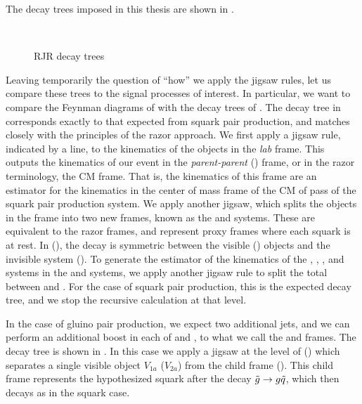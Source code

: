 The decay trees imposed in this thesis are shown in .
\begin{figure}[tbp]
\caption{RJR decay trees} \label{fig:decay_trees}
 \\
\end{figure}
Leaving temporarily the question of ``how'' we apply the jigsaw rules, let us compare these trees to the signal processes of interest.
In particular, we want to compare the Feynman diagrams of  with the decay trees of .
The decay tree in  corresponds exactly to that expected from squark pair production, and matches closely with the principles of the razor approach.
We first apply a jigsaw rule, indicated by a line, to the kinematics of the objects in the \textit{lab} frame.
This outputs the kinematics of our event in the \textit{parent-parent} (\PP) frame, or in the razor terminology, the CM frame.
That is, the kinematics of this frame are an estimator for the kinematics in the center of mass frame of the CM of pass of the squark pair production system.
We apply another jigsaw, which splits the objects in the \PP frame into two new frames, known as the \Pa and \Pb systems.
These are equivalent to the razor frames, and represent proxy frames where each squark is at rest.
In \Pa (\Pb), the decay is symmetric between the visible \Va (\Vb) objects and the invisible system \Ia (\Ib).
To generate the estimator of the kinematics of the \Va, \Vb, \Ia, and \Ib systems in the \Pa and \Pb systems, we apply another jigsaw rule to split the total \met between \Pa and \Pb.
For the case of squark pair production, this is the expected decay tree, and we stop the recursive calculation at that level.

In the case of gluino pair production, we expect two additional jets, and we can perform an additional boost in each of \Pa and \Pb, to what we call the \Ca and \Cb frames.
The decay tree is shown in .
In this case we apply a jigsaw at the level of \Pa (\Pb) which separates a single visible object $V_{1a}$ ($V_{2a}$) from the child frame \Ca (\Cb).
This child frame represents the hypothesized squark after the decay $\tilde{g} \rightarrow g \tilde{q}$, which then decays as in the squark case.

